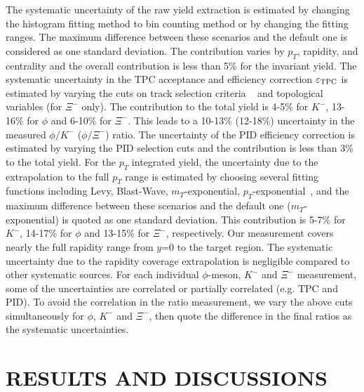 \documentclass[aps,tightenlines,superscriptaddress,twocolumn]{revtex4-1}
\begin{document}
The systematic uncertainty of the raw yield extraction is estimated by changing the histogram fitting method to bin counting method or by changing the fitting ranges. The maximum difference between these scenarios and the default one is considered as one standard deviation. The contribution varies by $p_T$, rapidity, and centrality and the overall contribution is less than 5\% for the invariant yield. The systematic uncertainty in the TPC acceptance and efficiency correction $\varepsilon_{\rm TPC}$ is estimated by varying the cuts on track selection criteria ~\cite{Adamczyk:2017iwn} and topological variables (for $\Xi^-$ only). The contribution to the total yield is 4-5\% for $K^-$, 13-16\% for $\phi$ and 6-10\% for $\Xi^-$. This leads to a 10-13\% (12-18\%) uncertainty in the measured $\phi/K^-$ ($\phi/\Xi^-$) ratio. The uncertainty of the PID efficiency correction is estimated by varying the PID selection cuts and the contribution is less than 3\% to the total yield.
For the $p_T$ integrated yield, the uncertainty due to the extrapolation to the full $p_T$ range is estimated by choosing several fitting functions including Levy, Blast-Wave, $m_T$-exponential, $p_T$-exponential~\cite{STAR_particleYield:2009}, and the maximum difference between these scenarios and the default one ($m_T$-exponential) is quoted as one standard deviation. This contribution is 5-7\% for $K^-$, 14-17\% for $\phi$ and 13-15\% for $\Xi^-$, respectively. 
Our measurement covers nearly the full rapidity range from $y$=0 to the target region. The systematic uncertainty due to the rapidity coverage extrapolation is negligible compared to other systematic sources.
For each individual $\phi$-meson, $K^-$ and $\Xi^-$ measurement, some of the uncertainties are correlated or partially correlated (e.g. TPC and PID). To avoid the correlation in the ratio measurement, we vary the above cuts simultaneously for $\phi$, $K^-$ and $\Xi^-$, then quote the difference in the final ratios as the systematic uncertainties.


\section{RESULTS AND DISCUSSIONS}
\label{results}
\end{document}
